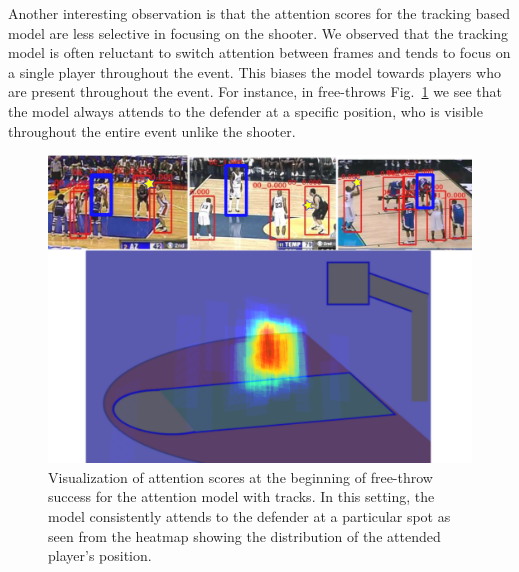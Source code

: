 Another interesting observation
is that the
attention scores for the tracking based model are less selective in focusing on
the shooter.  We observed that the tracking model is often reluctant to switch
attention between frames and tends to focus on a single player throughout the
event. This biases the model towards players who are present throughout the
event. For instance, in free-throws Fig.~\ref{fig:visual_attention_trackspec} we see that
the model always attends to the defender at a specific position, who is visible
throughout the entire event unlike the shooter.

\begin{figure}[t!]
\begin{center}
   \includegraphics[width=1.0\linewidth]{images/track_spec_output.pdf}
\end{center}
   \caption{Visualization of attention scores at the beginning of free-throw success
     for the attention model with tracks. In this setting, the model consistently
     attends to the defender at a particular spot as seen from the heatmap
     showing the distribution of the attended player's position.}
\label{fig:visual_attention_trackspec}
\end{figure}





